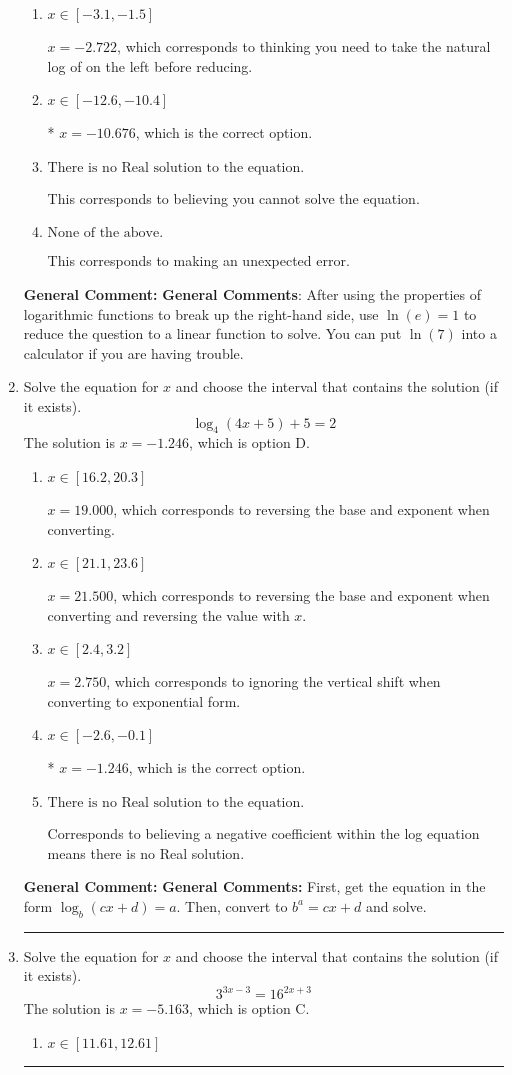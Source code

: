 \documentclass{extbook}[14pt]
\newcommand{\litem}[1]{\item #1

\rule{\textwidth}{0.4pt}}
\begin{document}
\begin{enumerate}
{\begin{enumerate}[label=\Alph*.]
$x = -3.342$, which corresponds to treating any root as a square root.
\item \( x \in [-3.1, -1.5] \)

$x = -2.722$, which corresponds to thinking you need to take the natural log of on the left before reducing.
\item \( x \in [-12.6, -10.4] \)

* $x = -10.676$, which is the correct option.
\item \( \text{There is no Real solution to the equation.} \)

This corresponds to believing you cannot solve the equation.
\item \( \text{None of the above.} \)

This corresponds to making an unexpected error.
\end{enumerate}

\textbf{General Comment:} \textbf{General Comments}: After using the properties of logarithmic functions to break up the right-hand side, use $\ln(e) = 1$ to reduce the question to a linear function to solve. You can put $\ln(7)$ into a calculator if you are having trouble.
}
\litem{
Solve the equation for $x$ and choose the interval that contains the solution (if it exists).
\[ \log_{4}{(4x+5)}+5 = 2 \]The solution is \( x = -1.246 \), which is option D.\begin{enumerate}[label=\Alph*.]
\item \( x \in [16.2, 20.3] \)

$x = 19.000$, which corresponds to reversing the base and exponent when converting.
\item \( x \in [21.1, 23.6] \)

$x = 21.500$, which corresponds to reversing the base and exponent when converting and reversing the value with $x$.
\item \( x \in [2.4, 3.2] \)

$x = 2.750$, which corresponds to ignoring the vertical shift when converting to exponential form.
\item \( x \in [-2.6, -0.1] \)

* $x = -1.246$, which is the correct option.
\item \( \text{There is no Real solution to the equation.} \)

Corresponds to believing a negative coefficient within the log equation means there is no Real solution.
\end{enumerate}

\textbf{General Comment:} \textbf{General Comments:} First, get the equation in the form $\log_b{(cx+d)} = a$. Then, convert to $b^a = cx+d$ and solve.
}
\litem{
Solve the equation for $x$ and choose the interval that contains the solution (if it exists).
\[ 3^{3x-3} = 16^{2x+3} \]The solution is \( x = -5.163 \), which is option C.\begin{enumerate}[label=\Alph*.]
\item \( x \in [11.61, 12.61] \)


\end{enumerate}}
\end{enumerate}
\end{document}

